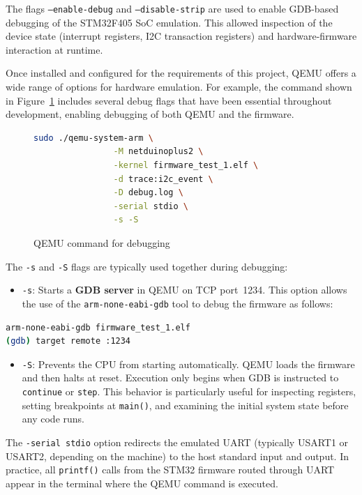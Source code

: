The flags \texttt{--enable-debug} and \texttt{--disable-strip} are used to enable GDB-based debugging of the STM32F405 SoC emulation. This allowed inspection of the device state (interrupt registers, I2C transaction registers) and hardware-firmware interaction at runtime.


Once installed and configured for the requirements of this project, QEMU offers a 
wide range of options for hardware emulation. For example, the command shown in 
Figure~\ref{fig:qemu_debug_cmd} includes several debug flags that have been essential 
throughout development, enabling debugging of both QEMU and the firmware.

\begin{figure}[H]
    \centering
    \begin{lstlisting}[language=bash]
        sudo ./qemu-system-arm \
                -M netduinoplus2 \
                -kernel firmware_test_1.elf \
                -d trace:i2c_event \
                -D debug.log \
                -serial stdio \
                -s -S
    \end{lstlisting}
    \caption{QEMU command for debugging}
    \label{fig:qemu_debug_cmd}
\end{figure}


The \texttt{-s} and \texttt{-S} flags are typically used together during debugging:

\begin{itemize}
  \item \texttt{-s}: Starts a \textbf{GDB server} in QEMU on TCP port~1234. This 
  option allows the use of the \texttt{arm-none-eabi-gdb} tool to debug the firmware 
  as follows:
\end{itemize}

\begin{lstlisting}[language=bash, caption={Connecting GDB to the QEMU GDB server}, label={code:gdb_connect}]
arm-none-eabi-gdb firmware_test_1.elf
(gdb) target remote :1234
\end{lstlisting}

\begin{itemize}
  \item \texttt{-S}: Prevents the CPU from starting automatically. QEMU loads the 
  firmware and then halts at reset. Execution only begins when GDB is instructed to 
  \texttt{continue} or \texttt{step}. This behavior is particularly useful for 
  inspecting registers, setting breakpoints at \texttt{main()}, and examining the 
  initial system state before any code runs.
\end{itemize}

The \texttt{-serial stdio} option redirects the emulated UART (typically USART1 or 
USART2, depending on the machine) to the host standard input and output. In practice, 
all \texttt{printf()} calls from the STM32 firmware routed through UART appear in the 
terminal where the QEMU command is executed.


